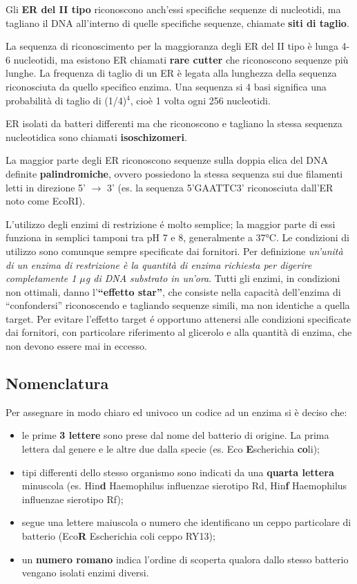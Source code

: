 \documentclass[11pt]{book}
\begin{document}
Gli \textbf{ER del II tipo} riconoscono anch'essi specifiche sequenze di
nucleotidi, ma tagliano il DNA all'interno di quelle specifiche
sequenze, chiamate \textbf{siti di taglio}.

La sequenza di riconoscimento per la maggioranza degli ER del II tipo è
lunga 4-6 nucleotidi, ma esistono ER chiamati \textbf{rare cutter} che
riconoscono sequenze più lunghe. La frequenza di taglio di un ER è
legata alla lunghezza della sequenza riconosciuta da quello specifico
enzima. Una sequenza si 4 basi significa una probabilità di taglio di
(1/4)\(^4\), cioè 1 volta ogni 256 nucleotidi.

ER isolati da batteri differenti ma che riconoscono e tagliano la stessa
sequenza nucleotidica sono chiamati \textbf{isoschizomeri}.

La maggior parte degli ER riconoscono sequenze sulla doppia elica del
DNA definite \textbf{palindromiche}, ovvero possiedono la stessa
sequenza sui due filamenti letti in direzione 5' \(\rightarrow\) 3' (es.
la sequenza 5'GAATTC3' riconosciuta dall'ER noto come EcoRI).

L'utilizzo degli enzimi di restrizione é molto semplice; la maggior
parte di essi funziona in semplici tamponi tra pH 7 e 8, generalmente a
37°C. Le condizioni di utilizzo sono comunque sempre specificate dai
fornitori. Per definizione \emph{un'unità di un enzima di restrizione è
la quantità di enzima richiesta per digerire completamente 1 \(\mu\)g di
DNA substrato in un'ora}. Tutti gli enzimi, in condizioni non ottimali,
danno l'\textbf{``effetto star''}, che consiste nella capacità
dell'enzima di ``confondersi'' riconoscendo e tagliando sequenze simili,
ma non identiche a quella target. Per evitare l'effetto target é
opportuno attenersi alle condizioni specificate dai fornitori, con
particolare riferimento al glicerolo e alla quantità di enzima, che non
devono essere mai in eccesso.

\subsection{Nomenclatura}\label{nomenclatura}

Per assegnare in modo chiaro ed univoco un codice ad un enzima si è
deciso che:

\begin{itemize}
\itemsep1pt\parskip0pt
\item
  le prime \textbf{3 lettere} sono prese dal nome del batterio di
  origine. La prima lettera dal genere e le altre due dalla specie (es.
  Eco \textbf{E}scherichia \textbf{co}li);
\item
  tipi differenti dello stesso organismo sono indicati da una
  \textbf{quarta lettera} minuscola (es. Hin\textbf{d} Haemophilus
  influenzae sierotipo Rd, Hin\textbf{f} Haemophilus influenzae
  sierotipo Rf);
\item
  segue una lettere maiuscola o numero che identificano un ceppo
  particolare di batterio (Eco\textbf{R} Escherichia coli ceppo RY13);
\item
  un \textbf{numero romano} indica l'ordine di scoperta qualora dallo
  stesso batterio vengano isolati enzimi diversi.
\end{itemize}
\end{document}
